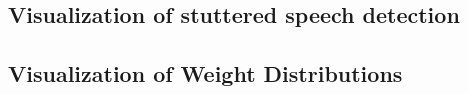 \subsection{Visualization of stuttered speech detection}

\subsection{Visualization of Weight Distributions}

